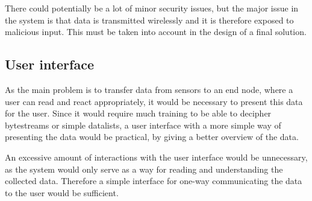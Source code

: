 There could potentially be a lot of minor security issues, but the major issue in the system is that data is transmitted wirelessly and it is therefore exposed to malicious input. This must be taken into account in the design of a final solution.

\subsection{User interface}
As the main problem is to transfer data from sensors to an end node, where a user can read and react appropriately, it would be necessary to present this data for the user. Since it would require much training to be able to decipher bytestreams or simple datalists, a user interface with a more simple way of presenting the data would be practical, by giving a better overview of the data.

An excessive amount of interactions with the user interface would be unnecessary, as the system would only serve as a way for reading and understanding the collected data. Therefore a simple interface for one-way communicating the data to the user would be sufficient.
